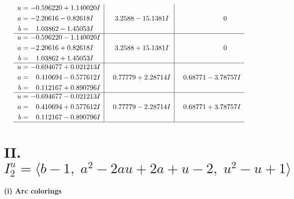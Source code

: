 \documentclass[1p]{elsarticle_modified}
\theoremstyle{definition}
\begin{document}
$$\begin{array}{c|c|c}
\begin{aligned}
u &= -0.596220 + 1.140020 I \\
a &= -2.20616 - 0.82618 I \\
b &= \phantom{-}1.03862 - 1.45053 I\end{aligned}
 & \phantom{-}3.2588 - 15.1381 I & \phantom{-0.000000 } 0 \\ \hline\begin{aligned}
u &= -0.596220 - 1.140020 I \\
a &= -2.20616 + 0.82618 I \\
b &= \phantom{-}1.03862 + 1.45053 I\end{aligned}
 & \phantom{-}3.2588 + 15.1381 I & \phantom{-0.000000 } 0 \\ \hline\begin{aligned}
u &= -0.694677 + 0.021213 I \\
a &= \phantom{-}0.410694 - 0.577612 I \\
b &= \phantom{-}0.112167 + 0.890796 I\end{aligned}
 & \phantom{-}0.77779 + 2.28714 I & \phantom{-}0.68771 - 3.78757 I \\ \hline\begin{aligned}
u &= -0.694677 - 0.021213 I \\
a &= \phantom{-}0.410694 + 0.577612 I \\
b &= \phantom{-}0.112167 - 0.890796 I\end{aligned}
 & \phantom{-}0.77779 - 2.28714 I & \phantom{-}0.68771 + 3.78757 I\\
 \hline 
 \end{array}$$\newpage\newpage\renewcommand{\arraystretch}{1}
\centering \section*{II. $I^u_{2}= \langle b-1,\;a^2-2 a u+2 a+u-2,\;u^2- u+1 \rangle$}
\flushleft \textbf{(i) Arc colorings}\\
\end{document}
